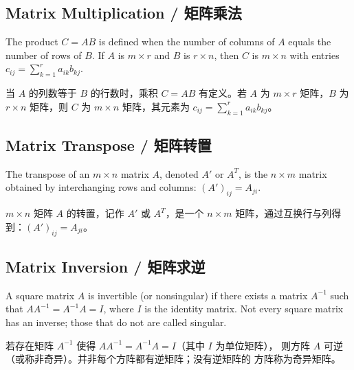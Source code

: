 \subsection{Matrix Multiplication / 矩阵乘法}

\begin{original}
The product $C = AB$ is defined when the number of columns of $A$
equals the number of rows of $B$.  If $A$ is $m \times r$ and $B$ is
$r \times n$, then $C$ is $m \times n$ with entries
$c_{ij} = \sum_{k=1}^{r} a_{ik} b_{kj}$.
\end{original}
\begin{translation}
当 $A$ 的列数等于 $B$ 的行数时，乘积 $C = AB$ 有定义。若 $A$ 为
$m \times r$ 矩阵，$B$ 为 $r \times n$ 矩阵，则 $C$ 为 $m \times n$
矩阵，其元素为 $c_{ij} = \sum_{k=1}^{r} a_{ik} b_{kj}$。
\end{translation}

\subsection{Matrix Transpose / 矩阵转置}

\begin{original}
The transpose of an $m \times n$ matrix $A$, denoted $A'$ or $A^{T}$,
is the $n \times m$ matrix obtained by interchanging rows and columns:
$(A')_{ij} = A_{ji}$.
\end{original}
\begin{translation}
$m \times n$ 矩阵 $A$ 的转置，记作 $A'$ 或 $A^{T}$，是一个
$n \times m$ 矩阵，通过互换行与列得到：$(A')_{ij} = A_{ji}$。
\end{translation}

\subsection{Matrix Inversion / 矩阵求逆}

\begin{original}
A square matrix $A$ is invertible (or nonsingular) if there exists a
matrix $A^{-1}$ such that $AA^{-1} = A^{-1}A = I$, where $I$ is the
identity matrix.  Not every square matrix has an inverse; those that
do not are called singular.
\end{original}
\begin{translation}
若存在矩阵 $A^{-1}$ 使得 $AA^{-1} = A^{-1}A = I$（其中 $I$ 为单位矩阵），
则方阵 $A$ 可逆（或称非奇异）。并非每个方阵都有逆矩阵；没有逆矩阵的
方阵称为奇异矩阵。
\end{translation}

